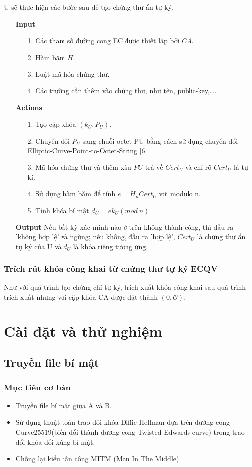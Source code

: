 \documentclass[a4paper,12pt]{report}
\begin{document}
U sẽ thực hiện các bước sau để tạo chứng thư ẩn tự ký.
\begin{itemize}
\item[] \textbf{Input}
\begin{itemize}
\item[1. ] Các tham số đường cong EC được thiết lập bởi $CA$.
\item[2. ] Hàm băm $H$.
\item[3. ] Luật mã hóa chứng thư.
\item[4. ] Các trường cần thêm vào chứng thư, như tên, public-key,\ldots .
\end{itemize}
\item[] \textbf{Actions}
\begin{itemize}
\item[1. ] Tạo cặp khóa $(k_U, P_U)$.
\item[2. ] Chuyển đổi $P_U$ sang chuỗi octet PU bằng cách sử dụng chuyển đổi Elliptic-Curve-Point-to-Octet-String [6]
\item[3. ] Mã hóa chứng thư và thêm xâu $PU$ trả về $Cert_U$ và chỉ rõ $Cert_U$ là tự kí.
\item[4. ] Sử dụng hàm băm để tính $e = H_n{Cert_U}$ vơi modulo n.
\item[5. ] Tính khóa bí mật $d_U = ek_U (mod \ n)$
\end{itemize}
\item[] \textbf{Output} Nếu bất kỳ xác minh nào ở trên không thành công, thì đầu ra 'không hợp lệ' và ngừng; nếu không, đầu ra 'hợp lệ', $Cert_U$ là chứng thư ẩn tự ký của U và $d_U$ là khóa riêng tương ứng.
\end{itemize}
\subsection{Trích rút khóa công khai từ chứng thư tự ký ECQV}
Như với quá trình tạo chứng chỉ tự ký, trích xuất khóa công khai sau quá trình trích xuất nhưng với cặp khóa CA được đặt thành $(0, \mathcal{O})$.
\begin{itemize}
\item[] \textbf{}
\end{itemize}
\chapter{Cài đặt và thử nghiệm}
\section{Truyền file bí mật}
\subsection*{Mục tiêu cơ bản}
\begin{itemize}
\item Truyền file bí mật giữa A và B.
\item Sử dụng thuật toán trao đổi khóa Diffie-Hellman dựa trên đường cong Curve25519(biến đổi thành đương cong Twisted Edwards curve) trong trao đổi khóa đối xứng bí mật.
\item Chống lại kiểu tấn công MITM (Man In The Middle)
\end{itemize}
\end{document}
